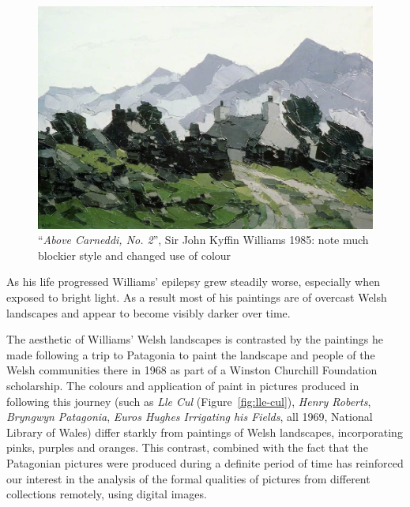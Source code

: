 \begin{figure}[h]
\includegraphics[width=\linewidth]{img/above_carneddi_no_2.jpeg}
\caption[``\emph{Above Carneddi, No. 2}'']{``\emph{Above Carneddi, No. 2}'', Sir John Kyffin Williams 1985: note much
blockier style and changed use of colour}\label{late_example}
\end{figure}

As his life progressed Williams' epilepsy grew steadily worse, especially when exposed to 
bright light. As a result most of his paintings are of overcast Welsh landscapes and appear to 
become visibly darker over time\cite{Harris2011How}.


The aesthetic of Williams' Welsh landscapes is contrasted by the paintings he
made following a trip to Patagonia to paint the landscape and people of the
Welsh communities there in 1968 as part of a Winston Churchill Foundation
scholarship. The colours and application of paint in pictures produced in
following this journey (such as \emph{Lle Cul} (Figure~\ref{fig:lle-cul}), \emph{Henry Roberts},
\emph{Bryngwyn Patagonia}, \emph{Euros Hughes Irrigating his Fields}, all 1969,
National Library of Wales) differ starkly from paintings of Welsh landscapes,
incorporating pinks, purples and oranges. This contrast, combined with the fact
that the Patagonian pictures were produced during a definite period of time has
reinforced our interest in the analysis of the formal qualities of pictures
from different collections remotely, using digital images. 

